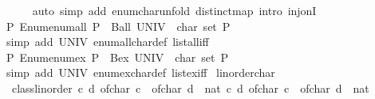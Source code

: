 \begin{isabellebody}
\ \ \ \ \isamarkupfalse%
\ {\isacharparenleft}{\kern0pt}auto\ simp\ add{\isacharcolon}{\kern0pt}\ enum{\isacharunderscore}{\kern0pt}char{\isacharunderscore}{\kern0pt}unfold\ distinct{\isacharunderscore}{\kern0pt}map\ intro{\isacharcolon}{\kern0pt}\ inj{\isacharunderscore}{\kern0pt}onI{\isacharparenright}{\kern0pt}\isanewline
\ \ \isamarkupfalse%
\ {\isachardoublequoteopen}{\isasymAnd}P{\isachardot}{\kern0pt}\ Enum{\isachardot}{\kern0pt}enum{\isacharunderscore}{\kern0pt}all\ P\ {\isasymlongleftrightarrow}\ Ball\ {\isacharparenleft}{\kern0pt}UNIV\ {\isacharcolon}{\kern0pt}{\isacharcolon}{\kern0pt}\ char\ set{\isacharparenright}{\kern0pt}\ P{\isachardoublequoteclose}\isanewline
\ \ \ \ \isamarkupfalse%
\ {\isacharparenleft}{\kern0pt}simp\ add{\isacharcolon}{\kern0pt}\ UNIV\ enum{\isacharunderscore}{\kern0pt}all{\isacharunderscore}{\kern0pt}char{\isacharunderscore}{\kern0pt}def\ list{\isacharunderscore}{\kern0pt}all{\isacharunderscore}{\kern0pt}iff{\isacharparenright}{\kern0pt}\isanewline
\ \ \isamarkupfalse%
\ {\isachardoublequoteopen}{\isasymAnd}P{\isachardot}{\kern0pt}\ Enum{\isachardot}{\kern0pt}enum{\isacharunderscore}{\kern0pt}ex\ P\ {\isasymlongleftrightarrow}\ Bex\ {\isacharparenleft}{\kern0pt}UNIV\ {\isacharcolon}{\kern0pt}{\isacharcolon}{\kern0pt}\ char\ set{\isacharparenright}{\kern0pt}\ P{\isachardoublequoteclose}\isanewline
\ \ \ \ \isamarkupfalse%
\ {\isacharparenleft}{\kern0pt}simp\ add{\isacharcolon}{\kern0pt}\ UNIV\ enum{\isacharunderscore}{\kern0pt}ex{\isacharunderscore}{\kern0pt}char{\isacharunderscore}{\kern0pt}def\ list{\isacharunderscore}{\kern0pt}ex{\isacharunderscore}{\kern0pt}iff{\isacharparenright}{\kern0pt}\isanewline
{}\isamarkupfalse%
%
\endisatagproof
{\isafoldproof}%
%
\isadelimproof
%
\endisadelimproof
\isanewline
\isanewline
{}\isamarkupfalse%
\isanewline
\isanewline
{}\isamarkupfalse%
\ linorder{\isacharunderscore}{\kern0pt}char{\isacharcolon}{\kern0pt}\isanewline
\ \ {\isachardoublequoteopen}class{\isachardot}{\kern0pt}linorder\ {\isacharparenleft}{\kern0pt}{\isasymlambda}c\ d{\isachardot}{\kern0pt}\ of{\isacharunderscore}{\kern0pt}char\ c\ {\isasymle}\ {\isacharparenleft}{\kern0pt}of{\isacharunderscore}{\kern0pt}char\ d\ {\isacharcolon}{\kern0pt}{\isacharcolon}{\kern0pt}\ nat{\isacharparenright}{\kern0pt}{\isacharparenright}{\kern0pt}\ {\isacharparenleft}{\kern0pt}{\isasymlambda}c\ d{\isachardot}{\kern0pt}\ of{\isacharunderscore}{\kern0pt}char\ c\ {\isacharless}{\kern0pt}\ {\isacharparenleft}{\kern0pt}of{\isacharunderscore}{\kern0pt}char\ d\ {\isacharcolon}{\kern0pt}{\isacharcolon}{\kern0pt}\ nat{\isacharparenright}{\kern0pt}{\isacharparenright}{\kern0pt}{\isachardoublequoteclose}\isanewline

\end{isabellebody}
